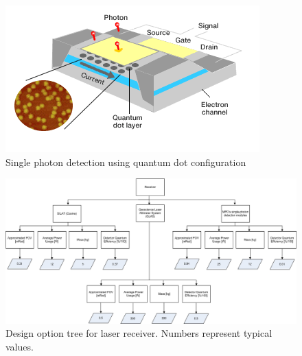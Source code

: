 \begin{figure} [ht]
\begin{center}
\includegraphics[scale=1]{chapters/img/blDOreceiverQDRD.png}	
\caption{Single photon detection using quantum dot configuration}
\label{quantumdot}
\end{center}
\end{figure}

\begin{figure} [ht]
\begin{center} \includegraphics[width=1\textwidth,angle=90]{chapters/img/DOStree_receiver.jpg}	
\caption{Design option tree for laser receiver. Numbers represent typical values.}
\label{DOS_receiver}
\end{center}
\end{figure}
